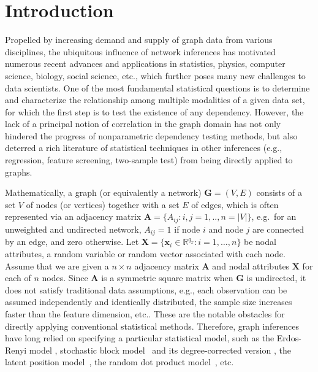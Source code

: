 \documentclass[11pt]{article}
\theoremstyle{definition}
\begin{document}
\sloppy
\doublespacing

\section{Introduction}
\label{sec:intro}
	\vspace*{-0.2cm}
Propelled by increasing demand and supply of graph data from various disciplines, the ubiquitous influence of network inferences has motivated numerous recent advances and applications in statistics, physics, computer science, biology, social science, etc., which further poses many new challenges to data scientists. One of the most fundamental statistical questions is to determine and characterize the relationship among multiple modalities of a given data set, for which the first step is to test the existence of any dependency. However, the lack of a principal notion of correlation in the graph domain has not only hindered the progress of nonparametric dependency testing methods, but also deterred a rich literature of statistical techniques in other inferences (e.g., regression, feature screening, two-sample test) from being directly applied to graphs.
 
Mathematically, a graph (or equivalently a network) $\mathbf{G}=(V,E)$ consists of a set $V$ of nodes (or vertices) together with a set $E$ of edges, which is often represented via an adjacency matrix $\mathbf{A} = \{A_{ij} : i,j= 1,..,n = |V| \}$, e.g.~for an unweighted and undirected network, $A_{ij} = 1$ if node $i$ and node $j$ are connected by an edge, and zero otherwise. Let $\mathbf{X} = \{  \mathbf{x}_{i} \in \mathbb{R}^{q_{x}} : i = 1, \ldots, n \}$ be nodal attributes, a random variable or random vector associated with each node. Assume that we are given a $n \times n$ adjacency matrix $\mathbf{A}$ and nodal attributes $\mathbf{X}$ for each of $n$ nodes. Since $\mathbf{A}$ is a symmetric square matrix when $\mathbf{G}$ is undirected, it does not satisfy traditional data assumptions, e.g., each observation can be assumed independently and identically distributed, the sample size increases faster than the feature dimension, etc.. These are the notable obstacles for directly applying conventional statistical methods. Therefore, graph inferences have long relied on specifying a particular statistical model, such as the Erdos-Renyi model \cite{erdosrenyi1959,Gilbert1959}, stochastic block model~\cite{HollandEtAl1983, rohe2011spectral,SussmanEtAl2012,Lei2015} and its degree-corrected version \cite{karrer2011stochastic, ZhaoLevinaZhu2012}, the latent position model~\cite{TangSussmanPriebe2013,fosdick2015testing}, the random dot product model~\cite{YoungScheinerman2007, sussman2014consistent}, etc. 
\end{document}
